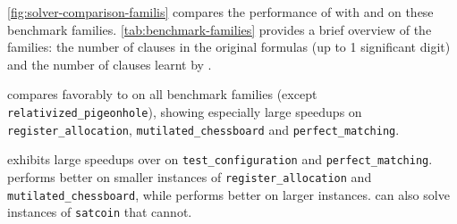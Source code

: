 \autoref{fig:solver-comparison-familis} compares the performance of \tool with
\cadical and \prelearn on these benchmark families. \autoref{tab:benchmark-families} 
provides a brief overview of the families: the number of clauses in the original formulas 
(up to 1 significant digit) and the number of \pr clauses learnt by \tool.

\tool compares favorably to \cadical on all benchmark families (except
\texttt{relativized\_pigeonhole}), showing especially large speedups on
\texttt{register\_allocation}, \texttt{mutilated\_chessboard} and
\texttt{perfect\_matching}. 

\prelearn exhibits large speedups
over \tool on \texttt{test\_configuration} and \texttt{perfect\_matching}. \tool
performs better on smaller instances of \texttt{register\_allocation} and
\texttt{mutilated\_chessboard}, while \prelearn performs better on larger
instances. \tool can also solve instances of \texttt{satcoin} that \prelearn
cannot.




